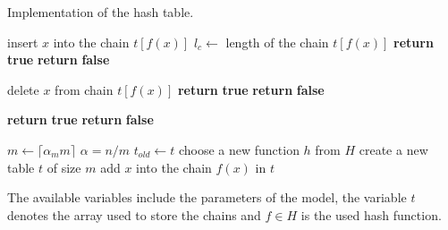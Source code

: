 \begin{algorithm}[ht]
\caption{Implementation of the hash table.}
\label{algorithm-hash-table}
\begin{minipage}[t]{0.5\linewidth}
\begin{algorithmic}
		\State insert $x$ into the chain $t[f(x)]$
		\State $l_c \leftarrow $ length of the chain $t[f(x)]$
			\State {}
		\EndIf
		\State \textbf{return} \textbf{true} 
	\Else
		\State \textbf{return} \textbf{false} 
	\EndIf
\EndProcedure
\end{algorithmic}
\vspace{0.1cm}
\begin{algorithmic}
		\State delete $x$ from chain $t[f(x)]$
			\State {}
		\EndIf
		\State \textbf{return} \textbf{true} 
	\Else
		\State \textbf{return} \textbf{false} 
	\EndIf
\EndProcedure
\end{algorithmic}
\end{minipage}
\hfill
\begin{minipage}[t]{0.49\linewidth}
\begin{algorithmic}
		\State \textbf{return} \textbf{true} 
	\Else
		\State \textbf{return} \textbf{false} 
	\EndIf
\EndProcedure
\end{algorithmic}
\vspace{0.1cm}
\begin{algorithmic}
	\State {}
		\State $m \leftarrow \lceil\alpha_m m\rceil$
		\State $\alpha = n / m$
	\EndIf
	\State $t_{old} \leftarrow t$
	\State choose a new function $h$ from $H$
	\Repeat
	\State create a new table $t$ of size $m$
		\State add $x$ into the chain $f(x)$ in $t$
	\EndFor
\EndProcedure
\end{algorithmic}
\end{minipage}
\begin{minipage}[t]{\linewidth}
\vspace{0.3cm}
The available variables include the parameters of the model, the variable $t$ denotes the array used to store the chains and $f \in H$ is the used hash function.
\end{minipage}
\end{algorithm}